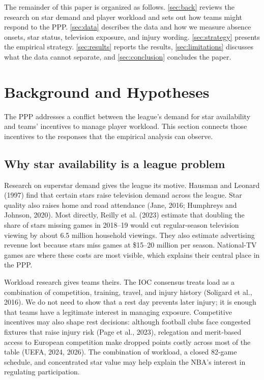\documentclass[11pt]{article}
\begin{document}
The remainder of this paper is organized as follows. \autoref{sec:back} reviews the research on star demand and player workload and sets out how teams might respond to the PPP. \autoref{sec:data} describes the data and how we measure absence onsets, star status, television exposure, and injury wording. \autoref{sec:strategy} presents the empirical strategy. \autoref{sec:results} reports the results, \autoref{sec:limitations} discusses what the data cannot separate, and \autoref{sec:conclusion} concludes the paper.

\section{Background and Hypotheses} \label{sec:back}

The PPP addresses a conflict between the league's demand for star availability and teams' incentives to manage player workload. This section connects those incentives to the responses that the empirical analysis can observe.

\subsection{Why star availability is a league problem}

Research on superstar demand gives the league its motive. Hausman and Leonard (1997) find that certain stars raise television demand across the league. Star quality also raises home and road attendance (Jane, 2016; Humphreys and Johnson, 2020). Most directly, Reilly et al. (2023) estimate that doubling the share of stars missing games in 2018--19 would cut regular-season television viewing by about 6.5 million household viewings. They also estimate advertising revenue lost because stars miss games at \$15--20 million per season. National-TV games are where these costs are most visible, which explains their central place in the PPP.

Workload research gives teams theirs. The IOC consensus treats load as a combination of competition, training, travel, and injury history (Soligard et al., 2016). We do not need to show that a rest day prevents later injury; it is enough that teams have a legitimate interest in managing exposure. Competitive incentives may also shape rest decisions: although football clubs face congested fixtures that raise injury risk (Page et al., 2023), relegation and merit-based access to European competition make dropped points costly across most of the table (UEFA, 2024, 2026). The combination of workload, a closed 82-game schedule, and concentrated star value may help explain the NBA's interest in regulating participation.
\end{document}
